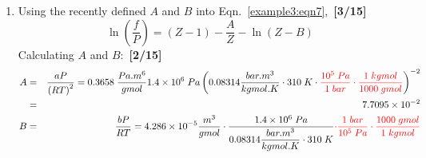 \documentclass[12pts,a4paper,amsmath,amssymb,floatfix]{article}%
\newcommand{\frc}{\displaystyle\frac}
\newcommand{\red}{\textcolor{red}}
\newcommand{\blue}{\textcolor{blue}}
\begin{document}
\begin{enumerate}[label=\bfseries Problem \arabic*]
{\begin{enumerate}
        \begin{displaymath}
            P = \frc{RT}{V-b} - \frc{a}{V^{2}} \Longleftrightarrow \frc{RT}{V}-P = \frc{RT}{V}-\frc{RT}{V-b}+\frc{a}{V^{2}}
        \end{displaymath}
        \begin{eqnarray}
           \frc{1}{RT}\int\limits_{V=\infty}^{V}\left(\frc{RT}{V}-P\right)dV &=& \int\limits_{V=\infty}^{V}\frc{dV}{V} - \int\limits_{V=\infty}^{V} \frc{dV}{V-b} + \int\limits_{V=\infty}^{V} \frc{adV}{RTV^{2}} \nonumber \\
           &=& \left.\ln\frc{V}{V-b}\right|_{V^{\infty}}^{V} - \left.\frc{a}{RTV}\right|_{V^{\infty}}^{V} \nonumber \\
           &=& \ln\frc{V}{V-b} - \ln\frc{V^{\infty}}{V^{\infty}-b} - \left( \frc{a}{RTV} - \frc{a}{RTV^{\infty}}\right) \nonumber \\
           & & \blue{\left(\text{ as } \ln\frc{\infty}{\infty} = 0\;\;\; \text{ and } \frc{1}{\infty} \approx 0\right)} \nonumber \\ 
           &=& -\ln\frc{V-b}{V} - \frc{a}{RTV} = -\ln\left(1-\frc{b}{V}\right) - \frc{a}{RTV}; \nonumber
        \end{eqnarray}
        Therefore, replacing in Eqn.~\ref{example3:eqn6} 
        \begin{equation}
           \mathbf{\ln\left(\frc{f}{P}\right) = -\ln\left(1-\frc{b}{V}\right) - \frc{a}{RTV} - \ln Z + \left(Z - 1\right);}\label{example3:eqn7}
        \end{equation}
        this is the fugacity equation for the vdW EOS model.~\hfill{\bf [4/15]}
   \item Using the recently defined $A$ and $B$ into Eqn.~\ref{example3:eqn7},~\hfill{\bf [3/15]}
           \begin{equation}
              \ln\left(\frc{f}{P}\right) = \left(Z-1\right) -\frc{A}{Z}-\ln\left(Z-B\right)\label{example3:eqn7b}
           \end{equation}
           Calculating $A$ and $B$:~\hfill{\bf [2/15]}
           \begin{eqnarray}
              A &=& \frc{aP}{\left(RT\right)^{2}}=0.3658\;\frc{Pa.m^{6}}{gmol} 1.4\times 10^{6}\;Pa \left(0.08314 \frc{bar.m^{3}}{kgmol.K}\cdot 310\;K\cdot \red{\frc{10^{5}\;Pa}{1\; bar} \cdot \frc{1\; kgmol}{1000\; gmol}}\right)^{-2} \nonumber \\
                &=& 7.7095\times 10^{-2} \nonumber \\
              B &=& \frc{bP}{RT} = 4.286\times 10^{-5} \frc{m^{3}}{gmol}\cdot \frc{1.4\times 10^{6}\;Pa}{0.08314 \frc{bar.m^{3}}{kgmol.K}\cdot 310\;K}\red{\cdot \frc{1\;bar}{10^{5}\;Pa}\cdot\frc{1000\; gmol}{1\; kgmol}} \nonumber \\

\end{eqnarray}
\end{enumerate}}
\end{enumerate}
\end{document}

